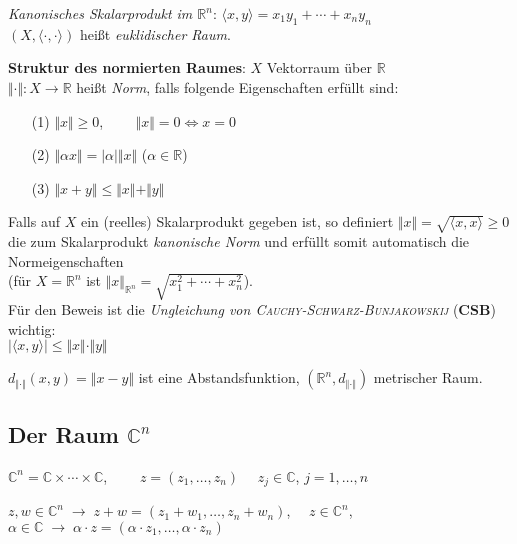 \emph{Kanonisches Skalarprodukt im $\mathbb{R}^n$}:
$\langle x, y \rangle = x_1 y_1 + \cdots + x_n y_n$ \\
$(X, \langle \cdot, \cdot \rangle)$ heißt \emph{euklidischer Raum}.

\linie

\textbf{Struktur des normierten Raumes}:
$X$ Vektorraum über $\mathbb{R}$ \\
$\Vert \cdot \Vert: X \rightarrow \mathbb{R}$ heißt \emph{Norm}, falls
folgende Eigenschaften erfüllt sind:

\begin{itemize}
    \item[(1)] $\Vert x \Vert \ge 0$,
    $\qquad \Vert x \Vert = 0 \Leftrightarrow x = 0$
    
    \item[(2)] $\Vert \alpha x \Vert = |\alpha| \Vert x \Vert$
    \qquad ($\alpha \in \mathbb{R}$)
    
    \item[(3)] $\Vert x + y \Vert \le \Vert x \Vert + \Vert y \Vert$
\end{itemize}

Falls auf $X$ ein (reelles) Skalarprodukt gegeben ist, so definiert
$\Vert x \Vert = \sqrt{\langle x, x \rangle} \ge 0$ die zum Skalarprodukt
\emph{kanonische Norm} und erfüllt somit automatisch die Normeigenschaften \\
(für $X = \mathbb{R}^n$ ist $\Vert x \Vert_{\mathbb{R}^n} =
\sqrt{x_1^2 + \cdots + x_n^2}$). \\
Für den Beweis ist die \emph{Ungleichung von
\textsc{Cauchy}-\textsc{Schwarz}-\textsc{Bunjakowskij}} (\textbf{CSB})
wichtig: \\
$|\langle x, y \rangle| \le \Vert x \Vert \cdot \Vert y \Vert$

$d_{\Vert \cdot \Vert}(x,y) = \Vert x - y \Vert$ ist eine Abstandsfunktion,
$(\mathbb{R}^n, d_{\Vert \cdot \Vert})$ metrischer Raum.

\subsection{%
    \texorpdfstring{Der Raum $\mathbb{C}^n$}{Der Raum ℂⁿ}%
}

$\mathbb{C}^n = \mathbb{C} \times \cdots \times \mathbb{C}$,
$\qquad z = (z_1, \ldots, z_n) \quad$ $z_j \in \mathbb{C}$,
$j = 1, \ldots, n$

$z, w \in \mathbb{C}^n \;\rightarrow\; z + w = (z_1 + w_1, \ldots, z_n + w_n)$,
$\quad z \in \mathbb{C}^n$, $\alpha \in \mathbb{C} \;\rightarrow\;
\alpha \cdot z = (\alpha \cdot z_1, \ldots, \alpha \cdot z_n)$

